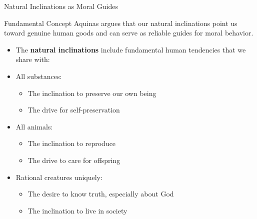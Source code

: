 \documentclass{beamer}
\begin{document}
\begin{frame}{Natural Inclinations as Moral Guides}
    \begin{alertblock}{Fundamental Concept}
        Aquinas argues that our natural inclinations point us toward genuine human goods and can serve as reliable guides for moral behavior.
    \end{alertblock}

    \begin{itemize}
        \item The \textbf{natural inclinations} include fundamental human tendencies that we share with:
        
        \item All substances:
            \begin{itemize}
                \item The inclination to preserve our own being
                \item The drive for self-preservation
            \end{itemize}
            
        \item All animals:
            \begin{itemize}
                \item The inclination to reproduce
                \item The drive to care for offspring
            \end{itemize}
            
        \item Rational creatures uniquely:
            \begin{itemize}
                \item The desire to know truth, especially about God
                \item The inclination to live in society
            \end{itemize}
    \end{itemize}
\end{frame}
\end{document}
